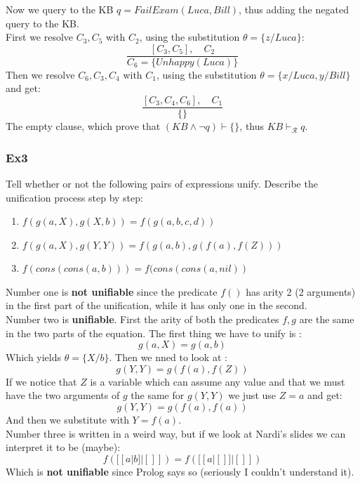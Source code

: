 \documentclass[10pt,a4paper]{article}
\begin{document}
Now we query to the KB $q= FailExam(Luca,Bill)$, thus adding the negated query to the KB.\\
First we resolve $C_3,C_5$ with $C_2$, using the substitution $\theta=\lbrace z/Luca \rbrace$:
\[\frac{[C_3,C_5],\quad C_2}{C_6=\lbrace Unhappy(Luca) \rbrace}\]
Then we resolve $C_6,C_3,C_4$ with $C_1$, using the substitution $\theta= \lbrace x/Luca, y/Bill \rbrace$ and get:
\[\frac{[C_3,C_4,C_6],\quad C_1}{\lbrace \rbrace}\]
The empty clause, which prove that $(KB \wedge \neg q)\vdash \{\}$, thus $KB \vdash_{\mathcal{R}} q$.


\subsubsection{Ex3}
Tell whether or not the following pairs of expressions unify. Describe the unification process step by step:
\begin{enumerate}
\item $f(g(a, X), g(X, b)) = f(g(a, b, c, d))$
\item $f(g(a, X), g(Y, Y )) = f(g(a, b), g(f(a), f(Z)))$
\item $f (cons(cons(a, b))) = f (cons(cons(a, nil))$
\end{enumerate}

Number one is \textbf{not unifiable} since the predicate $f()$ has arity 2 (2 arguments) in the first part of the unification, while it has only one in the second.\\

Number two is \textbf{unifiable}. First the arity of both the predicates $f,g$ are the same in the two parts of the equation. The first thing we have to unify is :
\[g(a,X)=g(a,b)\]
Which yields $\theta=\lbrace X/b \rbrace$. Then we nned to look at :
\[g(Y,Y)=g(f(a),f(Z))\]
If we notice that $Z$ is a variable which can assume any value and that we must have the two arguments of $g$ the same for $g(Y,Y)$ we just use $Z=a$ and get:
\[g(Y,Y)=g(f(a),f(a))\]
And then we substitute with $Y=f(a)$.\\

Number three is written in a weird way, but if we look at Nardi's slides we can interpret it to be (maybe):
\[ f([[a|b]|[]])=f([[a|[]]|[]]) \]
Which is \textbf{not unifiable} since Prolog says so (seriously I couldn't understand it).
\end{document}
